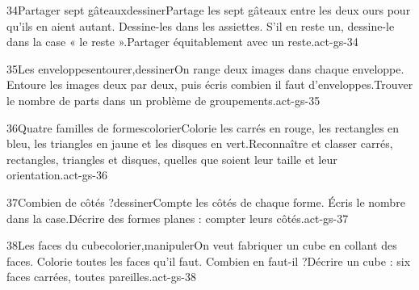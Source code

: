 \begin{activite}{34}{Partager sept gâteaux}{dessiner}{Partage les sept gâteaux entre les deux ours pour qu’ils en aient {\otBold\color{otNavy}autant}. Dessine-les dans les assiettes. S’il en reste un, dessine-le dans la case « le reste ».}{Partager équitablement avec un reste.}{act-gs-34}
\end{activite}
\begin{activite}{35}{Les enveloppes}{entourer,dessiner}{On range {\otBold\color{otNavy}deux} images dans chaque enveloppe. Entoure les images deux par deux, puis écris combien il faut d’enveloppes.}{Trouver le nombre de parts dans un problème de groupements.}{act-gs-35}
\end{activite}
\begin{activite}{36}{Quatre familles de formes}{colorier}{Colorie les carrés en {\otBold\color{otNavy}rouge}, les rectangles en {\otBold\color{otNavy}bleu}, les triangles en {\otBold\color{otNavy}jaune} et les disques en {\otBold\color{otNavy}vert}.}{Reconnaître et classer carrés, rectangles, triangles et disques, quelles que soient leur taille et leur orientation.}{act-gs-36}
\end{activite}
\begin{activite}{37}{Combien de côtés ?}{dessiner}{Compte les côtés de chaque forme. {\otBold\color{otNavy}Écris} le nombre dans la case.}{Décrire des formes planes : compter leurs côtés.}{act-gs-37}
\end{activite}
\begin{activite}{38}{Les faces du cube}{colorier,manipuler}{On veut fabriquer un cube en collant des faces. {\otBold\color{otNavy}Colorie} toutes les faces qu’il faut. Combien en faut-il ?}{Décrire un cube : six faces carrées, toutes pareilles.}{act-gs-38}
\end{activite}
